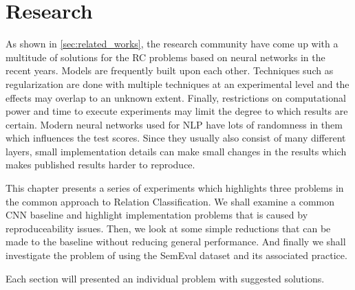 \chapter{Research}

As shown in \autoref{sec:related_works}, the research community have come up with a multitude of solutions for the RC problems based on neural networks in the recent years. Models are frequently built upon each other. Techniques such as regularization are done with multiple techniques at an experimental level and the effects may overlap to an unknown extent. Finally, restrictions on computational power and time to execute experiments may limit the degree to which results are certain. Modern neural networks used for NLP have lots of randomness in them which influences the test scores. Since they usually also consist of many different layers, small implementation details can make small changes in the results which makes published results harder to reproduce. 

This chapter presents a series of experiments which highlights three problems in the common approach to Relation Classification. We shall examine a common CNN baseline and highlight implementation problems that is caused by reproduceability issues. Then, we look at some simple reductions that can be made to the baseline without reducing general performance. And finally we shall investigate the problem of using the SemEval dataset and its associated practice. 

Each section will presented an individual problem with suggested solutions. 









